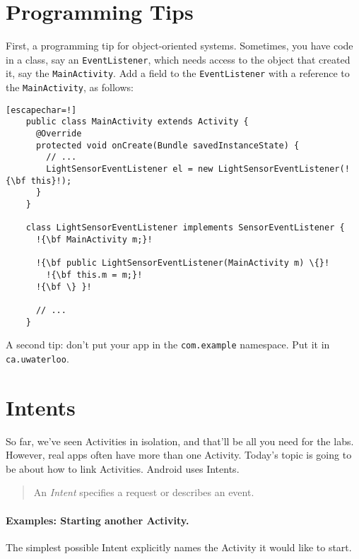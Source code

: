 




\section*{Programming Tips}

First, a programming tip for object-oriented systems. Sometimes, you have code
in a class, say an {\tt EventListener}, which needs access to the object
that created it, say the {\tt MainActivity}. Add a field to the {\tt EventListener}
with a reference to the {\tt MainActivity}, as follows:

{\scriptsize \begin{verbatim}[escapechar=!]
    public class MainActivity extends Activity {
      @Override
      protected void onCreate(Bundle savedInstanceState) {
        // ...
        LightSensorEventListener el = new LightSensorEventListener(!{\bf this}!);
      }
    }

    class LightSensorEventListener implements SensorEventListener {
      !{\bf MainActivity m;}!

      !{\bf public LightSensorEventListener(MainActivity m) \{}!
        !{\bf this.m = m;}!
      !{\bf \} }!

      // ...
    }
\end{verbatim}
}

A second tip: don't put your app in the {\tt com.example} namespace. Put it
in {\tt ca.uwaterloo}.

\section*{Intents}
So far, we've seen Activities in isolation, and that'll be all you need
for the labs. However, real apps often have more than one Activity. Today's topic
is going to be about how to link Activities. Android uses Intents.

\begin{quote}
An \emph{Intent} specifies a request or describes an event.
\end{quote}

\paragraph{Examples: Starting another Activity.} The simplest possible Intent
explicitly names the Activity it would like to start.

